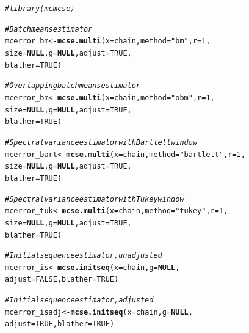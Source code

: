 \documentclass[11pt]{article}\usepackage[]{graphicx}\usepackage[]{color}
\makeatletter
\newcommand{\hlnum}[1]{\textcolor[rgb]{0.686,0.059,0.569}{#1}}%
\newcommand{\hlstr}[1]{\textcolor[rgb]{0.192,0.494,0.8}{#1}}%
\newcommand{\hlcom}[1]{\textcolor[rgb]{0.678,0.584,0.686}{\textit{#1}}}%
\newcommand{\hlstd}[1]{\textcolor[rgb]{0.345,0.345,0.345}{#1}}%
\newcommand{\hlkwa}[1]{\textcolor[rgb]{0.161,0.373,0.58}{\textbf{#1}}}%
\newcommand{\hlkwb}[1]{\textcolor[rgb]{0.69,0.353,0.396}{#1}}%
\newcommand{\hlkwc}[1]{\textcolor[rgb]{0.333,0.667,0.333}{#1}}%
\newcommand{\hlkwd}[1]{\textcolor[rgb]{0.737,0.353,0.396}{\textbf{#1}}}%
\newenvironment{kframe}{%
 \def\at@end@of@kframe{}%
 \ifinner\ifhmode%
  \def\at@end@of@kframe{\end{minipage}}%
  \begin{minipage}{\columnwidth}%
 \fi\fi%
 \def\FrameCommand##1{\hskip\@totalleftmargin \hskip-\fboxsep
 \colorbox{shadecolor}{##1}\hskip-\fboxsep
     \hskip-\linewidth \hskip-\@totalleftmargin \hskip\columnwidth}%
 \MakeFramed {\advance\hsize-\width
   \@totalleftmargin\z@ \linewidth\hsize
   \@setminipage}}%
 {\par\unskip\endMakeFramed%
 \at@end@of@kframe}
\newenvironment{knitrout}{}{} %
\makeatother
\begin{document}
\begin{knitrout}
\color{fgcolor}\begin{kframe}
\begin{alltt}
\hlcom{#library(mcmcse)}

\hlcom{# Batch means estimator}
\hlstd{mcerror_bm} \hlkwb{<-} \hlkwd{mcse.multi}\hlstd{(}\hlkwc{x} \hlstd{= chain,} \hlkwc{method} \hlstd{=}  \hlstr{"bm"}\hlstd{,} \hlkwc{r} \hlstd{=} \hlnum{1}\hlstd{,}
                         \hlkwc{size} \hlstd{=} \hlkwa{NULL}\hlstd{,} \hlkwc{g} \hlstd{=} \hlkwa{NULL}\hlstd{,} \hlkwc{adjust} \hlstd{=} \hlnum{TRUE}\hlstd{,}
                         \hlkwc{blather} \hlstd{=} \hlnum{TRUE}\hlstd{)}

\hlcom{# Overlapping batch means estimator}
\hlstd{mcerror_bm} \hlkwb{<-} \hlkwd{mcse.multi}\hlstd{(}\hlkwc{x} \hlstd{= chain,} \hlkwc{method} \hlstd{=}  \hlstr{"obm"}\hlstd{,} \hlkwc{r} \hlstd{=} \hlnum{1}\hlstd{,}
                         \hlkwc{size} \hlstd{=} \hlkwa{NULL}\hlstd{,} \hlkwc{g} \hlstd{=} \hlkwa{NULL}\hlstd{,} \hlkwc{adjust} \hlstd{=} \hlnum{TRUE}\hlstd{,}
                         \hlkwc{blather} \hlstd{=} \hlnum{TRUE}\hlstd{)}

\hlcom{# Spectral variance estimator with Bartlett window}
\hlstd{mcerror_bart} \hlkwb{<-} \hlkwd{mcse.multi}\hlstd{(}\hlkwc{x} \hlstd{= chain,} \hlkwc{method} \hlstd{=}  \hlstr{"bartlett"}\hlstd{,} \hlkwc{r} \hlstd{=} \hlnum{1}\hlstd{,}
                           \hlkwc{size} \hlstd{=} \hlkwa{NULL}\hlstd{,} \hlkwc{g} \hlstd{=} \hlkwa{NULL}\hlstd{,} \hlkwc{adjust} \hlstd{=} \hlnum{TRUE}\hlstd{,}
                           \hlkwc{blather} \hlstd{=} \hlnum{TRUE}\hlstd{)}

\hlcom{# Spectral variance estimator with Tukey window}
\hlstd{mcerror_tuk} \hlkwb{<-} \hlkwd{mcse.multi}\hlstd{(}\hlkwc{x} \hlstd{= chain,} \hlkwc{method} \hlstd{=}  \hlstr{"tukey"}\hlstd{,} \hlkwc{r} \hlstd{=} \hlnum{1}\hlstd{,}
                          \hlkwc{size} \hlstd{=} \hlkwa{NULL}\hlstd{,} \hlkwc{g} \hlstd{=} \hlkwa{NULL}\hlstd{,} \hlkwc{adjust} \hlstd{=} \hlnum{TRUE}\hlstd{,}
                          \hlkwc{blather} \hlstd{=} \hlnum{TRUE}\hlstd{)}

\hlcom{# Initial sequence estimator, unadjusted}
\hlstd{mcerror_is} \hlkwb{<-} \hlkwd{mcse.initseq}\hlstd{(}\hlkwc{x} \hlstd{= chain,} \hlkwc{g} \hlstd{=} \hlkwa{NULL}\hlstd{,}
                           \hlkwc{adjust} \hlstd{=} \hlnum{FALSE}\hlstd{,} \hlkwc{blather} \hlstd{=} \hlnum{TRUE}\hlstd{)}

\hlcom{# Initial sequence estimator, adjusted}
\hlstd{mcerror_isadj} \hlkwb{<-} \hlkwd{mcse.initseq}\hlstd{(}\hlkwc{x} \hlstd{= chain,} \hlkwc{g} \hlstd{=} \hlkwa{NULL}\hlstd{,}
                              \hlkwc{adjust} \hlstd{=} \hlnum{TRUE}\hlstd{,} \hlkwc{blather} \hlstd{=} \hlnum{TRUE}\hlstd{)}
\end{alltt}
\end{kframe}
\end{knitrout}
\end{document}
